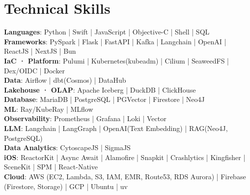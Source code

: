 \section{Technical Skills}
    \begin{itemize}[leftmargin=0.15in, label={}]
	\small{
        \item{
    	\textbf{Languages}{: Python | Swift | JavaScript | Objective-C | Shell | SQL}
            \\
            \textbf{Frameworks}{: PySpark | Flask | FastAPI | Kafka | Langchain | OpenAI | ReactJS | NextJS | Bun}
            \\
            \textbf{IaC · Platform}{: Pulumi | Kubernetes(kubeadm) | Cilium | SeaweedFS | Dex/OIDC | Docker}
            \\
            \textbf{Data}{: Airflow | dbt(Cosmos) | DataHub}
            \\
            \textbf{Lakehouse · OLAP}{: Apache Iceberg | DuckDB | ClickHouse}
            \\
            \textbf{Database}{: MariaDB | PostgreSQL | PGVector | Firestore | Neo4J}
            \\
            \textbf{ML}{: Ray/KubeRay | MLflow}
            \\
            \textbf{Observability}{: Prometheus | Grafana | Loki | Vector}
            \\
            \textbf{LLM}{: Langchain | LangGraph | OpenAI(Text Embedding) | RAG(Neo4J, PostgreSQL)}
            \\
            \textbf{Data Analytics}{: CytoscapeJS | SigmaJS}
            \\
            \textbf{iOS}{: ReactorKit | Async Await | Alamofire | Snapkit | Crashlytics | Kingfisher | SceneKit | SPM | React-Native}
            \\
            \textbf{Cloud}{: AWS (EC2, Lambda, S3, IAM, EMR, Route53, RDS Aurora) | Firebase (Firestore, Storage) | GCP | Ubuntu | uv}
        }
    }

    \end{itemize}
